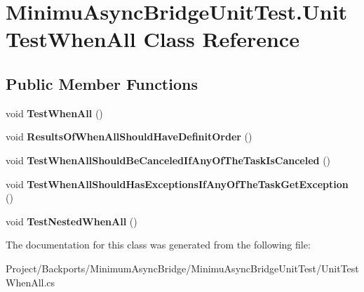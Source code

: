 \hypertarget{class_minimu_async_bridge_unit_test_1_1_unit_test_when_all}{}\section{Minimu\+Async\+Bridge\+Unit\+Test.\+Unit\+Test\+When\+All Class Reference}
\label{class_minimu_async_bridge_unit_test_1_1_unit_test_when_all}
\subsection*{Public Member Functions}
\begin{DoxyCompactItemize}
\item 
\mbox{\label{class_minimu_async_bridge_unit_test_1_1_unit_test_when_all_ac945bbf754b871e9ebad7a51e75c5dca}} 
void {\bfseries Test\+When\+All} ()
\item 
\mbox{\label{class_minimu_async_bridge_unit_test_1_1_unit_test_when_all_ac4159d0336a674cf4900c8679d88e4ba}} 
void {\bfseries Results\+Of\+When\+All\+Should\+Have\+Definit\+Order} ()
\item 
\mbox{\label{class_minimu_async_bridge_unit_test_1_1_unit_test_when_all_a506d4dabdc59968ee119d57b4fe2dca7}} 
void {\bfseries Test\+When\+All\+Should\+Be\+Canceled\+If\+Any\+Of\+The\+Task\+Is\+Canceled} ()
\item 
\mbox{\label{class_minimu_async_bridge_unit_test_1_1_unit_test_when_all_aec076eff774e6d134c9b65ca23eb3b85}} 
void {\bfseries Test\+When\+All\+Should\+Has\+Exceptions\+If\+Any\+Of\+The\+Task\+Get\+Exception} ()
\item 
\mbox{\label{class_minimu_async_bridge_unit_test_1_1_unit_test_when_all_a2c7c634aaa4c45c59e1ced410e485cff}} 
void {\bfseries Test\+Nested\+When\+All} ()
\end{DoxyCompactItemize}


The documentation for this class was generated from the following file\+:\begin{DoxyCompactItemize}
\item 
Project/\+Backports/\+Minimum\+Async\+Bridge/\+Minimu\+Async\+Bridge\+Unit\+Test/Unit\+Test\+When\+All.\+cs\end{DoxyCompactItemize}
